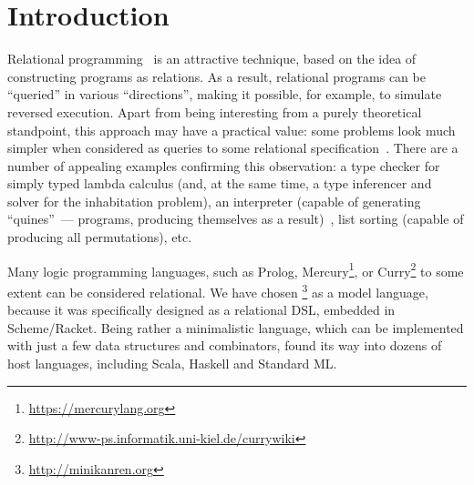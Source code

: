 \section{Introduction}
\label{intro}

Relational programming~\cite{TRS} is an attractive technique, based on the idea 
of constructing programs as relations.  As a result, relational programs can be
``queried'' in various ``directions'', making it possible, for example, to simulate
reversed execution. Apart from being interesting from a purely theoretical standpoint, 
this approach may have a practical value: some problems look much simpler 
when considered as queries to some relational specification~\cite{WillThesis}. There are a 
number of appealing examples confirming this observation: a type checker 
for simply typed lambda calculus (and, at the same time, a type inferencer and solver 
for the inhabitation problem), an interpreter (capable of generating ``quines''~--- 
programs, producing themselves as a result)~\cite{Untagged}, list sorting (capable of 
producing all permutations), etc. 

Many logic programming languages, such as Prolog, Mercury\footnote{\url{https://mercurylang.org}}, 
or Curry\footnote{\url{http://www-ps.informatik.uni-kiel.de/currywiki}} to some extent
can be considered relational. We have chosen \miniKanren\footnote{\url{http://minikanren.org}} 
as a model language, because it was specifically designed as a relational DSL, embedded in Scheme/Racket. 
Being rather a minimalistic language, which can be implemented with just a few data structures and
combinators, \miniKanren found its way into dozens of host languages, including Scala, Haskell and Standard ML.

